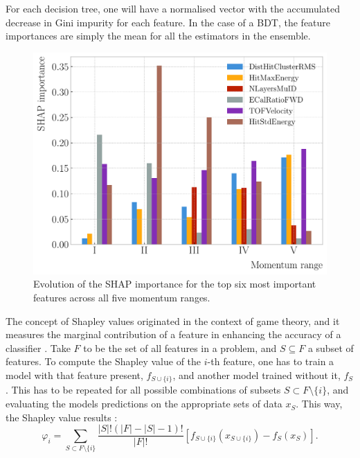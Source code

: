 For each decision tree, one will have a normalised vector with the accumulated decrease in Gini impurity for each feature. In the case of a BDT, the feature importances are simply the mean for all the estimators in the ensemble.

\begin{figure}[t]
	\centering
	\includegraphics[width=.85\linewidth]{Images/GArSoft_PID/BDT/summary_top_six.pdf}
	\caption{Evolution of the SHAP importance for the top six most important features across all five momentum ranges.}
	\label{fig:bdt_shap_regions}
\end{figure}

The concept of Shapley values originated in the context of game theory, and it measures the marginal contribution of a feature in enhancing the accuracy of a classifier \cite{Shapley1951}. Take $F$ to be the set of all features in a problem, and $S \subseteq F$ a subset of features. To compute the Shapley value of the $i$-th feature, one has to train a model with that feature present, $f_{S \cup \{i\}}$, and another model trained without it, $f_{S}$. This has to be repeated for all possible combinations of subsets $S \subset F \setminus \{i\}$, and evaluating the models predictions on the appropriate sets of data $x_{S}$. This way, the Shapley value results \cite{SHAP2017}:
\begin{equation}
	\varphi_{i} = \sum_{S \subset F \setminus \{i\}} \frac{|S|!(|F|-|S|-1)!}{|F|!} \left[f_{S \cup \{i\}}(x_{S \cup \{i\}}) - f_{S}(x_{S})\right].
\end{equation}

